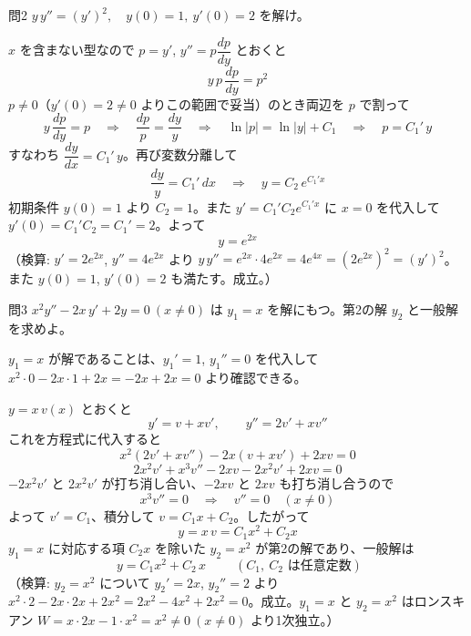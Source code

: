 \documentclass[a4paper,11pt]{article}
\begin{document}
\clearpage
\begin{mondaiboxS}{問2}
$y\,y'' = (y')^{2}, \quad y(0) = 1,\ y'(0) = 2$ を解け。
\end{mondaiboxS}
\kaitou
$x$ を含まない型なので $p = y'$, $y'' = p\dfrac{dp}{dy}$ とおくと
\[
y\,p\,\frac{dp}{dy} = p^{2}
\]
$p \neq 0$（$y'(0) = 2 \neq 0$ よりこの範囲で妥当）のとき両辺を $p$ で割って
\[
y\,\frac{dp}{dy} = p
\quad\Longrightarrow\quad
\frac{dp}{p} = \frac{dy}{y}
\quad\Longrightarrow\quad
\ln|p| = \ln|y| + C_{1}
\quad\Longrightarrow\quad
p = C_{1}'\,y
\]
すなわち $\dfrac{dy}{dx} = C_{1}'\,y$。再び変数分離して
\[
\frac{dy}{y} = C_{1}'\,dx
\quad\Longrightarrow\quad
y = C_{2}\,e^{C_{1}' x}
\]
初期条件 $y(0) = 1$ より $C_{2} = 1$。また $y' = C_{1}' C_{2} e^{C_{1}' x}$ に $x=0$ を代入して $y'(0) = C_{1}' C_{2} = C_{1}' = 2$。よって
\[
\boxed{\; y = e^{2x} \;}
\]
（検算: $y' = 2e^{2x}$, $y'' = 4e^{2x}$ より $y\,y'' = e^{2x}\cdot 4e^{2x} = 4e^{4x} = (2e^{2x})^{2} = (y')^{2}$。また $y(0)=1$, $y'(0)=2$ も満たす。成立。）

\clearpage
\begin{mondaiboxS}{問3}
$x^{2} y'' - 2x\,y' + 2y = 0 \ (x \neq 0)$ は $y_{1} = x$ を解にもつ。第2の解 $y_{2}$ と一般解を求めよ。
\end{mondaiboxS}
\kaitou
$y_{1} = x$ が解であることは、$y_{1}' = 1$, $y_{1}'' = 0$ を代入して
$x^{2}\cdot 0 - 2x\cdot 1 + 2x = -2x + 2x = 0$
より確認できる。

$y = x\,v(x)$ とおくと
\[
y' = v + x v', \qquad y'' = 2v' + x v''
\]
これを方程式に代入すると
\[
x^{2}(2v' + x v'') - 2x(v + x v') + 2x v = 0
\]
\[
2x^{2} v' + x^{3} v'' - 2x v - 2x^{2} v' + 2x v = 0
\]
$-2x^2 v'$ と $2x^2 v'$ が打ち消し合い、$-2xv$ と $2xv$ も打ち消し合うので
\[
x^{3} v'' = 0
\quad\Longrightarrow\quad
v'' = 0 \quad (x \neq 0)
\]
よって $v' = C_{1}$、積分して $v = C_{1} x + C_{2}$。したがって
\[
y = x\,v = C_{1} x^{2} + C_{2} x
\]
$y_{1} = x$ に対応する項 $C_{2}x$ を除いた $y_{2} = x^{2}$ が第2の解であり、一般解は
\[
\boxed{\; y = C_{1} x^{2} + C_{2}\,x \;}
\qquad (C_{1},\ C_{2} \text{ は任意定数})
\]
（検算: $y_{2} = x^{2}$ について $y_{2}' = 2x$, $y_{2}'' = 2$ より $x^{2}\cdot 2 - 2x\cdot 2x + 2x^{2} = 2x^{2} - 4x^{2} + 2x^{2} = 0$。成立。$y_{1} = x$ と $y_{2} = x^{2}$ はロンスキアン $W = x\cdot 2x - 1\cdot x^{2} = x^{2} \neq 0\ (x\neq0)$ より1次独立。）
\end{document}
